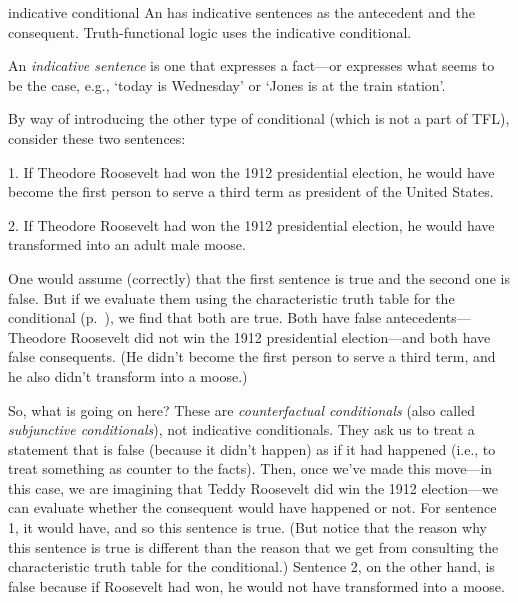 \begin{factboxy}{indicative conditional}
An  has indicative sentences as the antecedent and the consequent. Truth-functional logic uses the indicative conditional. 

An \textit{indicative sentence} is one that expresses a fact---or expresses what seems to be the case, e.g., `today is Wednesday' or `Jones is at the train station’.
\end{factboxy} 

By way of introducing the other type of conditional (which is not a part of TFL), consider these two sentences:

\begin{ebullet}
\item[1.] If Theodore Roosevelt had won the 1912 presidential election, he would have become the first person to serve a third term as president of the United States. \smallskip
\item[2.] If Theodore Roosevelt had won the 1912 presidential election, he would have transformed into an adult male moose.
\end{ebullet}
One would assume (correctly) that the first sentence is true and the second one is false. But if we evaluate them using the characteristic truth table for the conditional (p.~\pageref{characteristic-tt-conditional}), we find that both are true. Both have false antecedents---Theodore Roosevelt did not win the 1912 presidential election---and both have false consequents. (He didn’t become the first person to serve a third term, and he also didn’t transform into a moose.)

So, what is going on here? These are \textit{counterfactual conditionals} (also called \textit{subjunctive conditionals}), not indicative conditionals. They ask us to treat a statement that is false (because it didn’t happen) as if it had happened (i.e., to treat something as counter to the facts). Then, once we’ve made this move---in this case, we are imagining that Teddy Roosevelt did win the 1912 election---we can evaluate whether the consequent would have happened or not. For sentence 1, it would have, and so this sentence is true. (But notice that the reason why this sentence is true is different than the reason that we get from consulting the characteristic truth table for the conditional.) Sentence 2, on the other hand, is false because if Roosevelt had won, he would not have transformed into a moose.



